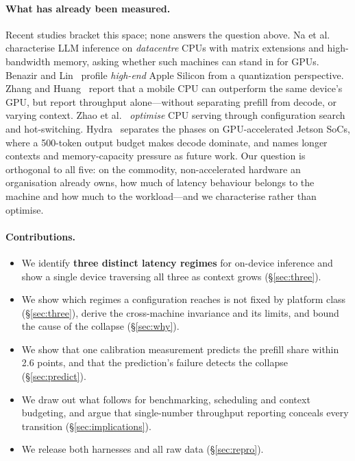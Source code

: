 \documentclass[sigconf,nonacm,10pt]{acmart}
\begin{document}
\paragraph{What has already been measured.} Recent studies bracket this space; none answers the question above. Na et al.~\cite{na2024cpuinference} characterise LLM inference on \emph{datacentre} CPUs
with matrix extensions and high-bandwidth memory, asking whether such machines can stand in for GPUs. Benazir and
Lin~\cite{benazir2025applequant} profile \emph{high-end} Apple Silicon from a quantization perspective. Zhang and
Huang~\cite{zhang2025cpuvsgpu} report that a mobile CPU can outperform the same device's GPU, but report
throughput alone---without separating prefill from decode, or varying context. Zhao et
al.~\cite{zhao2025sandwich} \emph{optimise} CPU serving through configuration search and hot-switching. Hydra~\cite{taherin2026hydra}
separates the phases on GPU-accelerated Jetson SoCs, where a 500-token output budget makes decode dominate, and
names longer contexts and memory-capacity pressure as future work. Our question is orthogonal to all five: on the commodity, non-accelerated hardware an organisation already owns, how
much of latency behaviour belongs to the machine and how much to the workload---and we characterise rather than
optimise.

\paragraph{Contributions.}
\begin{itemize}
  \item We identify \textbf{three distinct latency regimes} for on-device inference and show a single device
        traversing all three as context grows (\S\ref{sec:three}).
  \item We show which regimes a configuration reaches is not fixed by platform class (\S\ref{sec:three}),
        derive the cross-machine invariance and its limits, and bound the cause of the collapse (\S\ref{sec:why}).
  \item We show that one calibration measurement predicts the prefill share within 2.6 points, and that the
        prediction's failure detects the collapse (\S\ref{sec:predict}).
  \item We draw out what follows for benchmarking, scheduling and context budgeting, and argue that
        single-number throughput reporting conceals every transition (\S\ref{sec:implications}).
  \item We release both harnesses and all raw data (\S\ref{sec:repro}).
\end{itemize}
\end{document}
